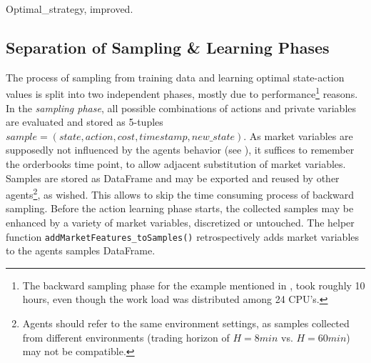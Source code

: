 \begin{algorithm}[H] 
 \caption{Optimal\_strategy, improved.}
     \SetAlgoLined
     \footnotesize
     

\label{alg:bruteforceimproved:pseudocode}
\end{algorithm}





\subsection{Separation of Sampling \& Learning Phases}
The process of sampling from training data and learning optimal state-action values is split into two independent phases, mostly due to performance\footnote{The backward sampling phase for the example mentioned in , took roughly 10 hours, even though the work load was distributed among 24 CPU's.} reasons. In the \emph{sampling phase}, all possible combinations of actions and private variables are evaluated and stored as 5-tuples $sample=(state, action, cost, timestamp, new\_state)$. As market variables are supposedly not influenced by the agents behavior (see ), it suffices to remember the orderbooks time point, to allow adjacent substitution of market variables.\\

Samples are stored as DataFrame and may be exported and reused by other agents\footnote{Agents should refer to the same environment settings, as samples collected from different environments (\eg trading horizon of $H=8min$ vs. $H=60min$) may not be compatible.}, as wished. This allows to skip the time consuming process of backward sampling. Before the action learning phase starts, the collected samples may be enhanced by a variety of market variables, discretized or untouched. The helper function \lstinline!addMarketFeatures_toSamples()! retrospectively adds market variables to the agents samples DataFrame.\\

